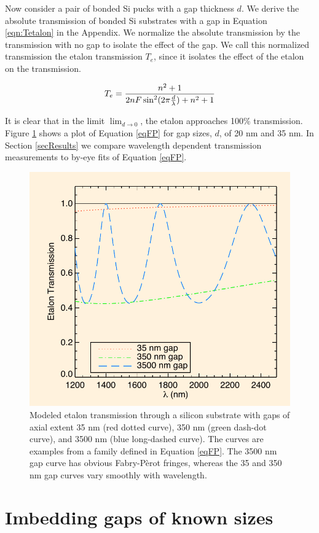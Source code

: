 \documentclass[osajnl,preprint,showpacs,superscriptaddress,12pt]{revtex4-1} %
\begin{document}
Now consider a pair of bonded Si pucks with a gap thickness $d$. We derive the absolute transmission of bonded Si substrates with a gap in Equation \ref{eqn:Tetalon} in the Appendix.  We normalize the absolute transmission by the transmission with no gap to isolate the effect of the gap.  We call this normalized transmission the etalon transmission $T_{e}$, since it isolates the effect of the etalon on the transmission.

$$T_{e} = \frac{n^2+1}{2 n F \sin ^2(2\pi \frac{d}{\lambda})+n^2+1} \label{eqFP} \\$$

It is clear that in the limit $\lim_{d \rightarrow 0}$, the etalon approaches 100\% transmission.  Figure \ref{figEtalonRelTrans} shows a plot of Equation \ref{eqFP} for gap sizes, $d$, of 20 nm and 35 nm.  In Section \ref{secResults} we compare wavelength dependent transmission measurements to by-eye fits of Equation \ref{eqFP}.  

\begin{figure}[htbp]
\centerline{\includegraphics[width=0.65\columnwidth]{figs/20140421_absoluteC.pdf}}
\caption{Modeled etalon transmission through a silicon substrate with gaps of axial extent 35 nm (red dotted curve), 350 nm (green dash-dot curve), and 3500 nm (blue long-dashed curve)\label{figEtalonRelTrans}.  The curves are examples from a family defined in Equation \ref{eqFP}.  The 3500 nm gap curve has obvious Fabry-P\`erot fringes, whereas the 35 and 350 nm gap curves vary smoothly with wavelength.} 
\end{figure}

\section{Imbedding gaps of known sizes}
\end{document}
